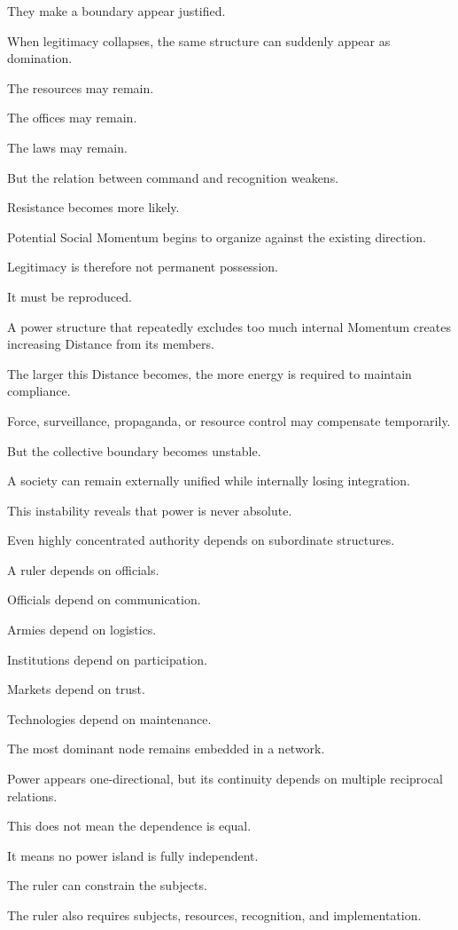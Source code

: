 They make a boundary appear justified.

When legitimacy collapses, the same structure can suddenly appear as domination.

The resources may remain.

The offices may remain.

The laws may remain.

But the relation between command and recognition weakens.

Resistance becomes more likely.

Potential Social Momentum begins to organize against the existing direction.

Legitimacy is therefore not permanent possession.

It must be reproduced.

A power structure that repeatedly excludes too much internal Momentum creates increasing Distance from its members.

The larger this Distance becomes, the more energy is required to maintain compliance.

Force, surveillance, propaganda, or resource control may compensate temporarily.

But the collective boundary becomes unstable.

A society can remain externally unified while internally losing integration.

This instability reveals that power is never absolute.

Even highly concentrated authority depends on subordinate structures.

A ruler depends on officials.

Officials depend on communication.

Armies depend on logistics.

Institutions depend on participation.

Markets depend on trust.

Technologies depend on maintenance.

The most dominant node remains embedded in a network.

Power appears one-directional, but its continuity depends on multiple reciprocal relations.

This does not mean the dependence is equal.

It means no power island is fully independent.

The ruler can constrain the subjects.

The ruler also requires subjects, resources, recognition, and implementation.

